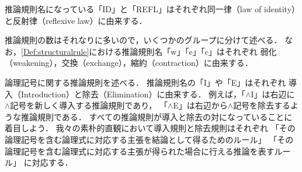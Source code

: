 推論規則名になっている「ID」と「REFL」はそれぞれ同一律（law of identity）と反射律（reflexive law）に由来する．

推論規則の数はそれなりに多いので，いくつかのグループに分けて述べる．
なお，\cref{Def:structuralrule}における推論規則名「w」「e」「c」はそれぞれ
弱化（weakening），交換（exchange），縮約（contraction）に由来する．


論理記号に関する推論規則を述べる．
推論規則名の「I」や「E」はそれぞれ
導入（Introduction）と除去（Elimination）に由来する．
例えば，「\(\land\)I」は右辺に\(\land\)記号を新しく導入する推論規則であり，
「\(\land\)E」は右辺から\(\land\)記号を除去するような推論規則である．
すべての推論規則が導入と除去の対になっていることに着目しよう．
我々の素朴的直観において導入規則と除去規則はそれぞれ
「その論理記号を含む論理式に対応する主張を結論として得るためのルール」
「その論理記号を含む論理式に対応する主張が得られた場合に行える推論を表すルール」
に対応する．


